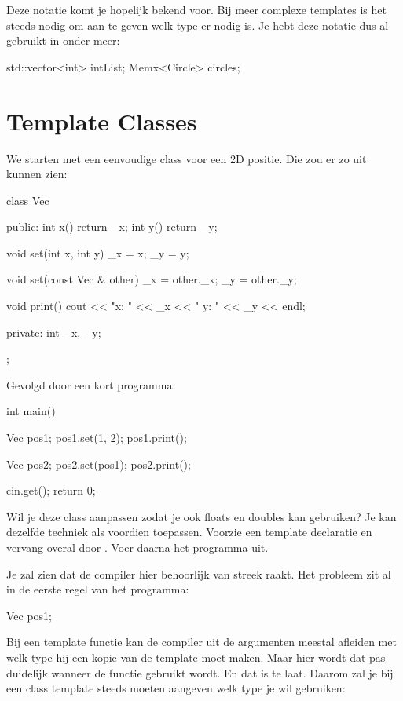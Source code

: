 \documentclass[11pt, oldfontcommands, oneside, a4paper]{memoir}
\begin{document}
Deze notatie komt je hopelijk bekend voor. Bij meer complexe templates is het steeds nodig om aan te geven welk type er nodig is. Je hebt deze notatie dus al gebruikt in onder meer:

\begin{code}
std::vector<int> intList;
Memx<Circle> circles;
\end{code}

\chapter{Template Classes}
We starten met een eenvoudige class voor een 2D positie. Die zou er zo uit kunnen zien:

\begin{code}
class Vec {
public:
  int x() { return _x; }
  int y() { return _y; }

  void set(int x, int y) {
  	_x = x;
  	_y = y;
  }

  void set(const Vec & other) {
  	_x = other._x;
  	_y = other._y;
  }

  void print() {
  	cout << "x: " << _x << " y: " << _y << endl;
  }

private:
  int _x, _y;
};
\end{code}

Gevolgd door een kort programma:

\begin{code}
int main() {
  Vec pos1;
  pos1.set(1, 2);
  pos1.print();

  Vec pos2;
  pos2.set(pos1);
  pos2.print();

  cin.get();
  return 0;
}
\end{code}

Wil je deze class aanpassen zodat je ook floats en doubles kan gebruiken? Je kan dezelfde techniek als voordien toepassen. Voorzie een template declaratie en vervang  overal door . Voer daarna het programma uit.

Je zal zien dat de compiler hier behoorlijk van streek raakt. Het probleem zit al in de eerste regel van het programma:

\begin{code}
Vec pos1;
\end{code}

Bij een template functie kan de compiler uit de argumenten meestal afleiden met welk type hij een kopie van de template moet maken. Maar hier wordt dat pas duidelijk wanneer de functie  gebruikt wordt. En dat is te laat. Daarom zal je bij een class template steeds moeten aangeven welk type je wil gebruiken:
\end{document}
